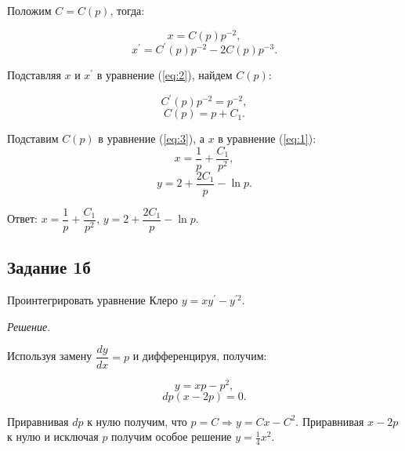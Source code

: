\documentclass[11pt, a4paper]{article}
\begin{document}
	\par
	Положим $C = C(p)$, тогда:
	
	\begin{equation}
    	x = C(p)p^{-2},\label{eq:3} 
	\end{equation}
	\begin{equation*}
		x^\prime = C^\prime(p)p^{-2} - 2C(p)p^{-3}.
	\end{equation*}
	
	\par
	Подставляя $x$ и $x^\prime$ в уравнение (\ref{eq:2}), найдем $C(p)$: 
	
	\begin{equation*}
    	C^\prime(p)p^{-2} = p^{-2},
	\end{equation*}
	\begin{equation*}
		C(p) = p + C_1.
	\end{equation*}
	
	\par
	Подставим $C(p)$ в уравнение (\ref{eq:3}), а $x$ в уравнение  (\ref{eq:1}):
	\begin{equation*}
		x = \dfrac{1}{p} + \dfrac{C_1}{p^2},
	\end{equation*}
	\begin{equation*}
		y = 2 + \dfrac{2C_1}{p} - \ln{p}.
	\end{equation*}
	
	\par\noindent
	Ответ: $x = \dfrac{1}{p} + \dfrac{C_1}{p^2}$, $y = 2 + \dfrac{2C_1}{p} - \ln{p}$.
	
	
	\subsection*{Задание 1б}
		
	Проинтегрировать уравнение Клеро $y = xy^\prime - y^{\prime 2}$.
	
	\vspace{0.2cm}
	\par
	\textit{Решение}. 
	
	\par
	Используя замену $\dfrac{dy}{dx} = p$ и дифференцируя, получим:
	
	\begin{equation*}
		y = xp - p^2,
	\end{equation*}
	\begin{equation*}
		dp(x - 2p) = 0.
	\end{equation*}
	
	\par
	Приравнивая $dp$ к нулю получим, что $p = C \Rightarrow y = Cx - C^2$. Приравнивая $x - 2p$ к нулю и исключая $p$ получим особое решение $y = \frac{1}{4} x^2$.
	
\end{document}
